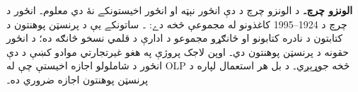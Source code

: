 \textbf{الونزو چرچ۔} د الونزو چرچ د دې انځور نېټه او انځور اخيستونکے نۀ دي معلوم۔ انځور د چرچ د 1924--1995 کاغذونو له مجموعې څخه دے: ۔ ساتونکے يې د پرنسټن پوهنتون د کتابتون د نادره کتابونو او ځانګړو مجموعو د ادارې د قلمي نسخو څانګه ده؛ د انځور حقونه د پرنسټن پوهنتون دي۔ اوپن لاجک پروژې په هغو غيرتجارتي موادو کښې د دې انځور د شاملولو اجازه اخيستې چې له OLP څخه جوړېږي۔ د بل هر استعمال لپاره د پرنسټن پوهنتون اجازه ضروري ده۔
